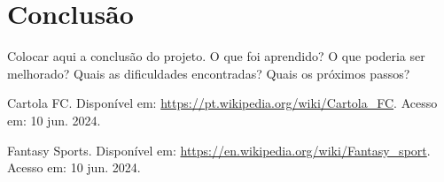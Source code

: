 \documentclass[12pt]{article}
\begin{document}
\section{Conclusão}
\label{sec:conclusao}

Colocar aqui a conclusão do projeto. O que foi aprendido? O que poderia ser melhorado? Quais as dificuldades encontradas? Quais os próximos passos?



\begin{thebibliography}{99}
  Cartola FC. Disponível em: \url{https://pt.wikipedia.org/wiki/Cartola_FC}. Acesso em: 10 jun. 2024.

  Fantasy Sports. Disponível em: \url{https://en.wikipedia.org/wiki/Fantasy_sport}. Acesso em: 10 jun. 2024.
\end{thebibliography}
\end{document}
